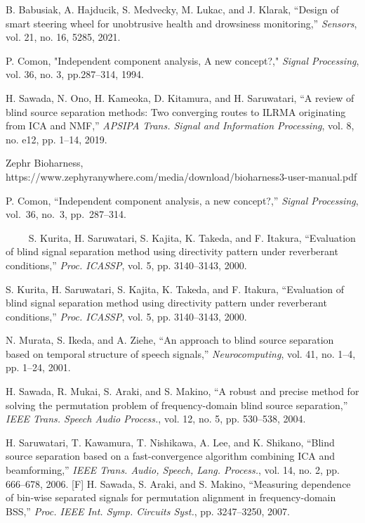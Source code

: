 \documentclass[honka]{nitkagawathesis}%
\begin{document}
\begin{thebibliography}{99}
  B. Babusiak, A. Hajducik, S. Medvecky, M. Lukac, and J. Klarak, ``Design of smart steering wheel for unobtrusive health and drowsiness monitoring,'' {\em Sensors}, 
  vol. 21, no. 16, 5285, 2021.

  P. Comon, "Independent component analysis, A new concept?," {\em Signal Processing}, vol. 36, no. 3, pp.287--314, 1994.

  H. Sawada, N. Ono, H. Kameoka, D. Kitamura, and H. Saruwatari, ``A review of
  blind source separation methods: Two converging routes to ILRMA originating from
  ICA and NMF,'' {\em APSIPA Trans. Signal and Information Processing}, vol. 8, no. e12,
  pp. 1–14, 2019.

   Zephr Bioharness, https://www.zephyranywhere.com/media/download/bioharness3-user-manual.pdf

    P. Comon, ``Independent component analysis, a new concept?,'' 
    {\em Signal Processing}, vol.~36, no.~3, pp.~287--314.

    S. Kurita, H. Saruwatari, S. Kajita, K. Takeda, and F. Itakura, ``Evaluation of blind signal separation method using directivity pattern under reverberant conditions,'' {\em Proc. ICASSP}, vol. 5, pp. 3140--3143, 2000.

    S. Kurita, H. Saruwatari, S. Kajita, K. Takeda, and F. Itakura, ``Evaluation of blind signal separation method using directivity pattern under reverberant conditions,'' {\em Proc. ICASSP}, vol. 5, pp. 3140--3143, 2000.

    N. Murata, S. Ikeda, and A. Ziehe, ``An approach to blind source separation based on temporal structure of speech signals,'' {\em Neurocomputing}, vol. 41, no. 1--4, pp. 1--24, 2001.

    H. Sawada, R. Mukai, S. Araki, and S. Makino, ``A robust and precise method for solving the permutation problem of frequency-domain blind source separation,'' {\em IEEE Trans. Speech Audio Process.}, vol. 12, no. 5, pp. 530--538, 2004.

    H. Saruwatari, T. Kawamura, T. Nishikawa, A. Lee, and K. Shikano, ``Blind source separation based on a fast-convergence algorithm combining ICA and beamforming,'' {\em IEEE Trans. Audio, Speech, Lang. Process.}, vol. 14, no. 2, pp. 666--678, 2006.
[F] H. Sawada, S. Araki, and S. Makino, ``Measuring dependence of bin-wise separated signals for permutation alignment in frequency-domain BSS,'' {\em Proc. IEEE Int. Symp. Circuits Syst.}, pp. 3247–3250, 2007.


\end{thebibliography}
\end{document}

